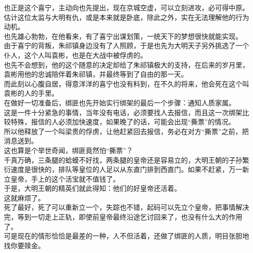 \begin{multicols}{\theparacolNo}
也正是这个喜宁，主动向也先提出，现在京城空虚，可以立刻进攻，必可得中原。\\

估计这位太监与大明有仇，或是本来就是卧底，除此之外，实在无法理解他的行为动机。\\

也先雄心勃勃，在他看来，有了喜宁出谋划策，一统天下的梦想很快就能实现。\\

由于喜宁的背叛，朱祁镇身边没有了人照顾，于是也先为大明天子另外挑选了一个仆人，这个人叫袁彬，也是在大战中被俘虏的。\\

也先不会想到，他的这个随意的决定却给了朱祁镇极大的支持，在后来的岁月里，袁彬用他的忠诚陪伴着朱祁镇，并最终等到了自由的那一天。\\

而此刻以心腹自居，得意洋洋的喜宁也没有料到，在不久的将来，他会死在这个叫袁彬的人的手里。\\

在做好一切准备后，绑匪也先开始实行绑架的最后一个步骤：通知人质家属。\\

这是一件十分紧急的事情，当年没有电话，必须要找人去报信，而且这一次绑架比较特殊，报信的人必须加快速度，如果晚了的话，可能会出现“撕票”的情况。\\

所以他释放了一个叫梁贵的俘虏，让他赶紧回去报信，务必在对方“撕票”之前，把消息送到。\\

这也算是个举世奇闻，绑匪竟然怕“撕票”？\\

千真万确，三条腿的蛤蟆不好找，两条腿的皇帝还是容易立的，大明王朝的子孙繁衍速度是很快的，排队等皇位的人足以从东直门排到西直门。如果不赶紧，万一新立皇帝，手上的这个活宝就不值钱了。\\

于是，大明王朝的精英们就此得知：他们的好皇帝还活着。\\

这就麻烦了。\\

死了最好，死了可以重新立一个，失踪也不错，起码可以先立个皇帝，把事情解决完，等到一切走上正轨，即使前皇帝最终沿途乞讨回来了，也没有什么大的作用了。\\

可是现在的情形恰恰是最差的一种，人不但活着，还做了绑匪的人质，明目张胆地找你要赎金。\\


\end{multicols}
